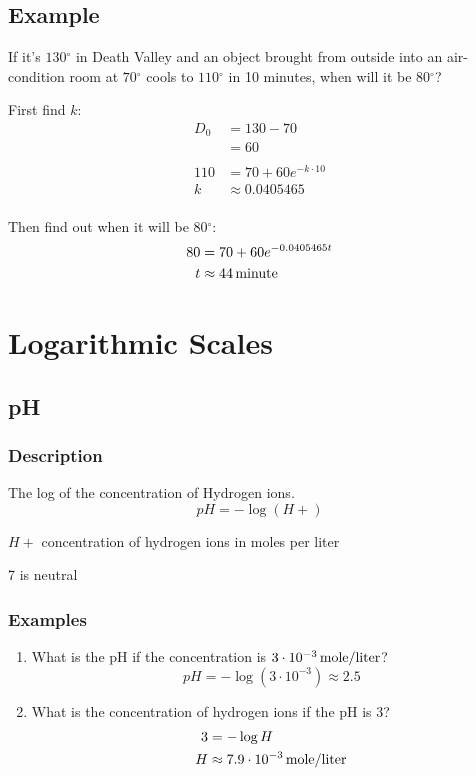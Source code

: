 \documentclass{exam}
\newcommand{\degree}{\ensuremath{^\circ}}
\begin{document}
  \subsection{Example}
    If it's $130 \degree$ in Death Valley and an object brought from outside into an air-condition room at $70
    \degree$ cools to $110 \degree$ in 10 minutes, when will it be $80 \degree$?

    First find $k$:
    \begin{align*}
      D_0 & = 130 - 70 \\
          & = 60 \\
      \\
      110 & = 70 + 60 e^{-k \cdot 10} \\
      k   & \approx 0.0405465 \\
    \end{align*}

    Then find out when it will be $80 \degree$:
    \begin{align*}
      80 & = 70 + 60 e^{-0.0405465 t} \\
      t  & \approx \unit[44]{minute} \\
    \end{align*}

  \section{Logarithmic Scales}

  \subsection{pH}
  \subsubsection{Description}
  The log of the concentration of Hydrogen ions.
  \[
    pH = - \log(H+)
  \]

  \begin{itemize*}
    \item $H+$ concentration of hydrogen ions in moles per liter
    \item 7 is neutral
  \end{itemize*}

  \subsubsection{Examples}

  \begin{enumerate}
    \item What is the pH if the concentration is $\unit[3 \cdot 10^{-3}]{mole/liter}$?
      \[
        pH = - \log \left( 3 \cdot 10^{-3} \right) \approx 2.5
      \]

    \item What is the concentration of hydrogen ions if the pH is 3?
      \begin{align*}
        3 &= - \log H \\
        H &\approx \unit[7.9 \cdot 10^{-3}]{mole/liter}
      \end{align*}

  \end{enumerate}
\end{document}
